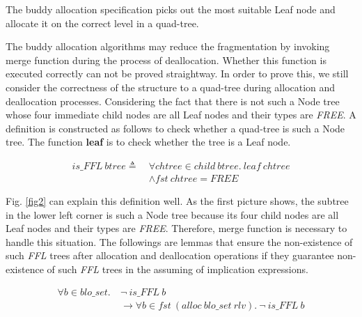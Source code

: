 \begin{theorem}
The buddy allocation specification picks out the most suitable Leaf node and allocate it on the correct level in a quad-tree.
\end{theorem}

The buddy allocation algorithms may reduce the fragmentation by invoking merge function during the process of deallocation. Whether this function is executed correctly can not be proved straightway. In order to prove this, we still consider the correctness of the structure to a quad-tree during allocation and deallocation processes. Considering the fact that there is not such a Node tree whose four immediate child nodes are all Leaf nodes and their types are \emph{FREE}. A definition is constructed as follows to check whether a quad-tree is such a Node tree. The function \textbf{leaf} is to check whether the tree is a Leaf node.

\begin{definition} 
\end{definition}
\vspace{-7pt}
{\footnotesize
\begin{align*}
is\_FFL\ btree \triangleq\ &\forall chtree \in child\ btree.\ leaf\ chtree \\
&\wedge fst\ chtree = FREE
\end{align*}
}
\vspace{-12pt}

Fig. \ref{fig2} can explain this definition well. As the first picture shows, the subtree in the lower left corner is such a Node tree because its four child nodes are all Leaf nodes and their types are \emph{FREE}. Therefore, merge function is necessary to handle this situation. The followings are lemmas that ensure the non-existence of such \emph{FFL} trees after allocation and deallocation operations if they guarantee non-existence of such \emph{FFL} trees in the assuming of implication expressions.

\begin{lemma} 
\label{allocffl}
\end{lemma}
\vspace{-7pt}
{\footnotesize
\begin{align*}
\forall b \in blo\_set.\ &\neg\ is\_FFL\ b \\
&\longrightarrow \forall b \in fst\ (alloc\ blo\_set\ rlv).\ \neg\ is\_FFL\ b
\end{align*}
}
\vspace{-12pt}

